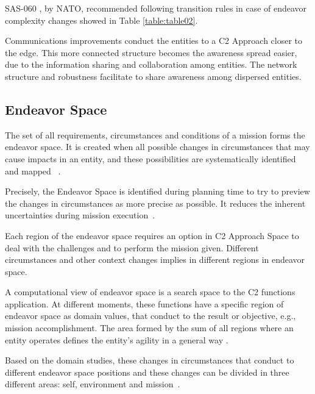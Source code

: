 SAS-060 \cite{nato01}, by \gls{NATO}, recommended following transition rules in case of endeavor complexity  changes showed in Table \ref{table:table02}.



Communications improvements conduct the entities to a C2 Approach closer to the edge. This more connected structure becomes the awareness spread easier, due to the information sharing and collaboration among entities. The network structure and robustness facilitate to share awareness among dispersed entities. 



\subsection{Endeavor Space}

The set of all requirements, circumstances and conditions of a mission forms the endeavor space. It is created when all possible changes in circumstances that may cause impacts in an entity, and these possibilities are systematically identified and mapped ~\cite{FRANCE2014}. 

Precisely, the Endeavor Space is identified during planning time to try to preview the changes in circumstances as more precise as possible. It reduces the inherent uncertainties during mission execution~\cite{FRANCE2014}.

Each region of the endeavor space requires an option in C2 Approach Space to deal with the challenges and to perform the mission given. Different circumstances and other context changes implies in different regions in endeavor space.

A computational view of endeavor space is a search space to the C2 functions application. At different moments, these functions have a specific region of endeavor space as domain values, that conduct to the result or objective, e.g., mission accomplishment. The area formed by the sum of all regions where an entity operates defines the entity's agility in a general way \cite{Alberts2011}.

Based on the domain studies, these changes in circumstances that conduct to different endeavor space positions and these changes can be divided in three different areas: self, environment and mission~\cite{Alberts2006}.



